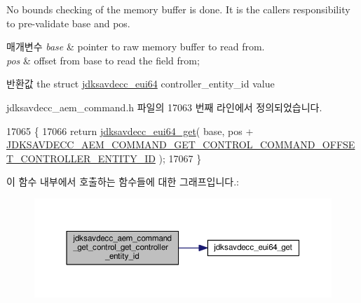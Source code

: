 No bounds checking of the memory buffer is done. It is the caller\textquotesingle{}s responsibility to pre-\/validate base and pos.


\begin{DoxyParams}{매개변수}
{\em base} & pointer to raw memory buffer to read from. \\
\hline
{\em pos} & offset from base to read the field from; \\
\hline
\end{DoxyParams}
\begin{DoxyReturn}{반환값}
the struct \hyperlink{structjdksavdecc__eui64}{jdksavdecc\+\_\+eui64} controller\+\_\+entity\+\_\+id value 
\end{DoxyReturn}


jdksavdecc\+\_\+aem\+\_\+command.\+h 파일의 17063 번째 라인에서 정의되었습니다.


\begin{DoxyCode}
17065 \{
17066     \textcolor{keywordflow}{return} \hyperlink{group__eui64_ga2652311a25a6b91cddbed75c108c7031}{jdksavdecc\_eui64\_get}( base, pos + 
      \hyperlink{group__command__get__control_ga88069ef3bf9591f48a585df13288d162}{JDKSAVDECC\_AEM\_COMMAND\_GET\_CONTROL\_COMMAND\_OFFSET\_CONTROLLER\_ENTITY\_ID}
       );
17067 \}
\end{DoxyCode}


이 함수 내부에서 호출하는 함수들에 대한 그래프입니다.\+:
\nopagebreak
\begin{figure}[H]
\begin{center}
\leavevmode
\includegraphics[width=350pt]{group__command__get__control_gac352b634515e5bec5342e405dee7d692_cgraph}
\end{center}
\end{figure}


